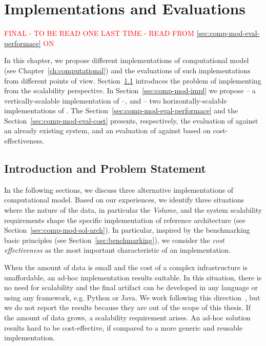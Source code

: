 \chapter{\texorpdfstring{\protect\river{}}{RIVER} Implementations and Evaluations}\label{ch:computational-impl}

\textcolor{red}{FINAL - TO BE READ ONE LAST TIME - READ FROM \ref{sec:comp-mod-eval-performace} ON}

In this chapter, we propose different implementations of \river{} computational model (see Chapter~\ref{ch:computational}) and the evaluations of such implementations from different points of view.
Section~\ref{sec:comp-mod-impl-intro} introduces the problem of implementing \river{} from the scalability perspective.
In Section~\ref{sec:comp-mod-impl} we propose \sti{} -- a vertically-scalable implementation of \river{} --, \sparkdi{} and \hivedi{} -- two horizontally-scalable implementations of \river{}.
The Section~\ref{sec:comp-mod-eval-performace} and the Section~\ref{sec:comp-mod-eval-cost} presents, respectively, the evaluation of \sti{} against an already existing system, and an evaluation of \sti{} against \sparkdi{} based on cost-effectiveness.

\section{Introduction and Problem Statement} \label{sec:comp-mod-impl-intro}
In the following sections, we discuss three alternative implementations of \river{} computational model.
Based on our experiences, we identify three situations where the nature of the data, in particular the \textit{Volume}, and the system scalability requirements shape the specific implementation of \river{} reference architecture (see Section~\ref{sec:comp-mod-sol-arch}).
In particular, inspired by the benchmarking basic principles (see Section~\ref{sec:benchmarking}), we consider the \textit{cost effectiveness} as the most important characteristic of an implementation.

When the amount of data is small and the cost of a complex infrastructure is unaffordable, an ad-hoc implementation results suitable.
In this situation, there is no need for scalability and the final artifact can be developed in any language or using any framework, e.g. Python or Java.
We work following this direction~\cite{BalduiniJBD2018}, but we do not report the results because they are out of the scope of this thesis.
If the amount of data grows, a scalability requirement arises. An ad-hoc solution results hard to be cost-effective, if compared to a more generic and reusable implementation. 

